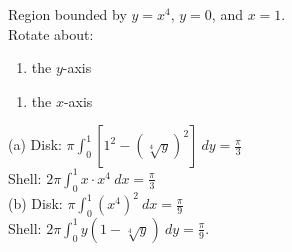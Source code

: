 {Region bounded by $y=x^4$, $y=0$, and $x=1$.\\
Rotate about:\\
\begin{minipage}{.5\linewidth}
 \begin{enumerate}
  \item the $y$-axis
 \end{enumerate}
\end{minipage}%
\begin{minipage}{.5\linewidth}
 \begin{enumerate}
  \item the $x$-axis
 \end{enumerate}
\end{minipage}}
{\noindent
(a) Disk: $\pi\int_0^1\left[1^2-(\sqrt[4]y)^2\right]\ dy=\frac\pi3$\\
Shell: $2\pi\int_0^1 x\cdot x^4\ dx=\frac\pi3$\\
(b) Disk: $\pi\int_0^1(x^4)^2\ dx=\frac\pi9$\\
Shell: $2\pi\int_0^1 y(1-\sqrt[4]y)\ dy=\frac\pi9$.}
